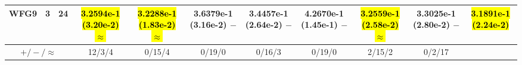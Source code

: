 \documentclass[journal]{IEEEtran}
\begin{document}
\begin{table*}[htbp]
\begin{tabular}{ccccccccccc}
\hline
\multirow{1}{*}{WFG9}&3&24&\hl{3.2594e-1 (3.20e-2) $\approx$}&\hl{3.2288e-1 (1.83e-2) $\approx$}&3.6379e-1 (3.16e-2) $-$&3.4457e-1 (2.64e-2) $-$&4.2670e-1 (1.45e-1) $-$&\hl{3.2559e-1 (2.58e-2) $\approx$}&3.3025e-1 (2.80e-2) $-$&\hl{3.1891e-1 (2.24e-2)}\\
\hline
\multicolumn{3}{c}{$+/-/\approx$}&12/3/4&0/15/4&0/19/0&0/16/3&0/19/0&2/15/2&0/2/17&\\
\bottomrule
\end{tabular}
\label{No Label}
\end{table*}
\end{document}

